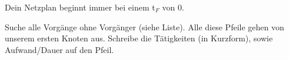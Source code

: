 \documentclass{beamer}
\begin{document}
\begin{frame}[t,shrink=65]
\par\vspace{1cm}\noindent 
\begin{itemize}
{\huge
	 \item<only@+> {Dein Netzplan beginnt immer bei einem t$_{F}$ von 0.}
	 
	  \item<only@+> {Suche alle Vorgänge ohne Vorgänger (siehe Liste). Alle diese Pfeile gehen von unserem ersten Knoten aus. Schreibe die Tätigkeiten (in Kurzform), sowie Aufwand/Dauer auf den Pfeil.}
	  
	\item \alert<+> {}
}
\end{itemize}
	
\end{frame}
\end{document}
